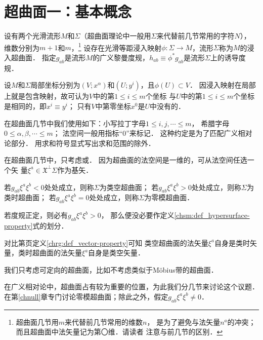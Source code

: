 
\section{超曲面一：基本概念}\label{chsm:sec_hypersurface-basic}
设有两个光滑流形$M$和$\Sigma$（超曲面理论中一般用$\Sigma$来代替前几节常用的字符$N$），
维数分别为$m+1$和$m$，{\footnote{超曲面几节用$m$来代替前几节常用的维数$n$，
        是为了避免与法矢量$n^a$的冲突；而且超曲面中法矢量记为第〇维．请读者
    注意与前几节的区别．}}
设存在光滑等距浸入映射$\phi:\Sigma\to M$，流形$\Sigma$称为$M$的{\heiti 浸入超曲面}．
指定$g_{ab}$是流形$M$的广义黎曼度规，$h_{ab}\equiv\phi^{*}g_{ab}$是流形$\Sigma$上的诱导度规．

设$M$和$\Sigma$局部坐标分别为$(V;x^\alpha)$和$(U;y^i)$，且$\phi(U)\subset V$．
因浸入映射在局部上就是包含映射，故可认为$V$中的第$1 \leqslant i \leqslant m$个坐标
与$U$中的第$1 \leqslant i \leqslant m$个坐标是相同的，即$x^i\equiv y^i$；
只有$V$中第零坐标$x^0$是$U$中没有的．

{\kaishu
在超曲面几节中我们使用如下：小写拉丁字母$1 \leqslant i,j,\cdots \leqslant m$，
希腊字母$0 \leqslant \alpha,\beta,\cdots \leqslant m$；
法空间一般用指标“$0$”来标记． }
这种约定是为了匹配广义相对论部分．
用求和符号显式写出求和范围的除外．

在超曲面几节中，只考虑或．
因为超曲面的法空间是一维的，可从法空间任选一个矢
量$\xi^a\in \mathfrak{X}^\bot{\Sigma}$作为基矢．
\begin{definition}\label{chsm:def_hypersurface-property}
    若$g_{ab} \xi^a \xi^b<0$处处成立，则称$\Sigma$为{\heiti 类空超曲面}；
    若$g_{ab} \xi^a \xi^b>0$处处成立，则称$\Sigma$为{\heiti 类时超曲面}；
    若$g_{ab} \xi^a \xi^b=0$处处成立，则称$\Sigma$为{\heiti 零模超曲面}．
\end{definition}

若度规正定，则必有$g_{ab} \xi^a \xi^b>0$，
那么便没必要作定义\ref{chsm:def_hypersurface-property}式的划分．


对比第\pageref{chrg:def_vector-property}页定义\ref{chrg:def_vector-property}可知
类空超曲面的法矢量$\xi^a$自身是类时矢量，类时超曲面的法矢量$\xi^a$自身是类空矢量．


我们只考虑可定向的超曲面，比如不考虑类似于M\"{o}bius带的超曲面．


在广义相对论中，超曲面占有较为重要的位置，为此我们分几节来讨论这个议题．
在第\ref{chnull}章专门讨论零模超曲面；除此之外，假定$g_{ab}\xi^a\xi^b\neq 0$．


